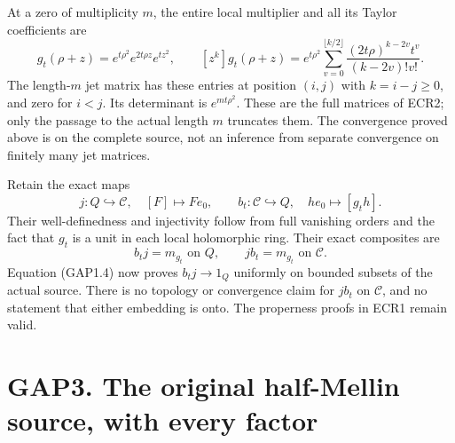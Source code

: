 At a zero of multiplicity \(m\), the entire local multiplier and all its
Taylor coefficients are \[
g_t(\rho+z)=e^{t\rho^2}e^{2t\rho z}e^{tz^2},\qquad
[z^k]g_t(\rho+z)=e^{t\rho^2}
\sum_{v=0}^{\lfloor k/2\rfloor}
\frac{(2t\rho)^{k-2v}t^v}{(k-2v)!v!}.
\tag{GAP2.2}
\] The length-\(m\) jet matrix has these entries at position \((i,j)\)
with \(k=i-j\ge0\), and zero for \(i<j\). Its determinant is
\(e^{mt\rho^2}\). These are the full matrices of ECR2; only the passage
to the actual length \(m\) truncates them. The convergence proved above
is on the complete source, not an inference from separate convergence on
finitely many jet matrices.

Retain the exact maps \[
j:Q\hookrightarrow\mathscr C,\quad [F]\mapsto F e_0,
\qquad b_t:\mathscr C\hookrightarrow Q,\quad h e_0\mapsto[g_th].
\] Their well-definedness and injectivity follow from full vanishing
orders and the fact that \(g_t\) is a unit in each local holomorphic
ring. Their exact composites are \[
b_tj=m_{g_t}\text{ on }Q,\qquad jb_t=m_{g_t}\text{ on }\mathscr C.
\tag{GAP2.3}
\] Equation (GAP1.4) now proves \(b_tj\to1_Q\) uniformly on bounded
subsets of the actual source. There is no topology or convergence claim
for \(jb_t\) on \(\mathscr C\), and no statement that either embedding
is onto. The properness proofs in ECR1 remain valid.

\section{GAP3. The original half-Mellin source, with every
factor}\label{gap3.-the-original-half-mellin-source-with-every-factor}


